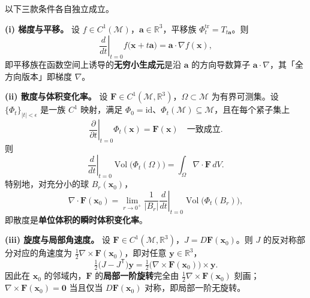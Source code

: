 \begin{theorem}[三个算子作为三类变换的无穷小生成元]\label{thm:infinitesimal_generators}
以下三款条件各自独立成立。

\textbf{(i) 梯度与平移。} 设 $f \in C^1(\mathcal{M})$，$\mathbf{a} \in \mathbb{R}^3$，平移族 $\Phi_t^{\mathrm{tr}} = T_{t\mathbf a}$。则
\[
\left.\frac{d}{dt}\right|_{t=0} f\bigl(\mathbf{x} + t\mathbf{a}\bigr) = \mathbf{a}\cdot\nabla f(\mathbf{x}),
\]
即平移族在函数空间上诱导的\textbf{无穷小生成元}是沿 $\mathbf a$ 的方向导数算子 $\mathbf a\cdot\nabla$，其「全方向版本」即梯度 $\nabla$。

\textbf{(ii) 散度与体积变化率。} 设 $\mathbf{F} \in C^1(\mathcal{M}, \mathbb{R}^3)$，$\Omega \subset \mathcal{M}$ 为有界可测集。设 $\{\Phi_t\}_{|t|<\epsilon}$ 是一族 $C^1$ 映射，满足 $\Phi_0 = \mathrm{id}$、$\Phi_t(\mathcal M)\subseteq\mathcal M$，且在每个紧子集上
\[
\left.\frac{\partial}{\partial t}\right|_{t=0}\Phi_t(\mathbf{x}) = \mathbf{F}(\mathbf{x}) \quad\text{一致成立}.
\]
则
\[
\left.\frac{d}{dt}\right|_{t=0}\operatorname{Vol}\bigl(\Phi_t(\Omega)\bigr) = \int_{\Omega} \nabla \cdot \mathbf{F} \, dV .
\]
特别地，对充分小的球 $B_r(\mathbf x_0)$，
\[
\nabla\cdot\mathbf F(\mathbf x_0) = \lim_{r\to0^+}\frac{1}{|B_r|}\left.\frac{d}{dt}\right|_{t=0}\operatorname{Vol}\bigl(\Phi_t(B_r)\bigr),
\]
即散度是\textbf{单位体积的瞬时体积变化率}。

\textbf{(iii) 旋度与局部角速度。} 设 $\mathbf{F} \in C^1(\mathcal{M}, \mathbb{R}^3)$，$J = D\mathbf F(\mathbf x_0)$。则 $J$ 的反对称部分对应的角速度为 $\tfrac12\nabla\times\mathbf F(\mathbf x_0)$，即对任意 $\mathbf{y}\in\mathbb R^3$，
\[
\tfrac{1}{2}\bigl(J - J^{\mathsf T}\bigr)\mathbf{y}
= \tfrac{1}{2}\bigl(\nabla\times\mathbf F(\mathbf x_0)\bigr)\times\mathbf{y}.
\]
因此在 $\mathbf x_0$ 的邻域内，$\mathbf F$ 的\textbf{局部一阶旋转}完全由 $\tfrac12\nabla\times\mathbf F(\mathbf x_0)$ 刻画；$\nabla\times\mathbf F(\mathbf x_0)=\mathbf 0$ 当且仅当 $D\mathbf F(\mathbf x_0)$ 对称，即局部一阶无旋转。
\end{theorem}

